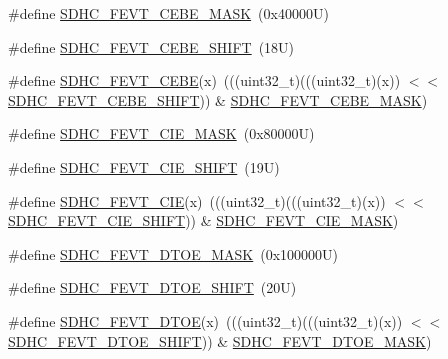 \begin{DoxyCompactItemize}
\item 
\#define \mbox{\hyperlink{group___s_d_h_c___register___masks_ga0d8b77f77f69ea2af8a8a6fe5162c0af}{S\+D\+H\+C\+\_\+\+F\+E\+V\+T\+\_\+\+C\+E\+B\+E\+\_\+\+M\+A\+SK}}~(0x40000\+U)
\item 
\#define \mbox{\hyperlink{group___s_d_h_c___register___masks_gaf981263c00f8808cfcde0ff564529bcc}{S\+D\+H\+C\+\_\+\+F\+E\+V\+T\+\_\+\+C\+E\+B\+E\+\_\+\+S\+H\+I\+FT}}~(18\+U)
\item 
\#define \mbox{\hyperlink{group___s_d_h_c___register___masks_ga8568ab4d0b42622858fb959bba7c5481}{S\+D\+H\+C\+\_\+\+F\+E\+V\+T\+\_\+\+C\+E\+BE}}(x)~(((uint32\+\_\+t)(((uint32\+\_\+t)(x)) $<$$<$ \mbox{\hyperlink{group___s_d_h_c___register___masks_gaf981263c00f8808cfcde0ff564529bcc}{S\+D\+H\+C\+\_\+\+F\+E\+V\+T\+\_\+\+C\+E\+B\+E\+\_\+\+S\+H\+I\+FT}})) \& \mbox{\hyperlink{group___s_d_h_c___register___masks_ga0d8b77f77f69ea2af8a8a6fe5162c0af}{S\+D\+H\+C\+\_\+\+F\+E\+V\+T\+\_\+\+C\+E\+B\+E\+\_\+\+M\+A\+SK}})
\item 
\#define \mbox{\hyperlink{group___s_d_h_c___register___masks_ga3c29789497e34050f12d49b5f8424531}{S\+D\+H\+C\+\_\+\+F\+E\+V\+T\+\_\+\+C\+I\+E\+\_\+\+M\+A\+SK}}~(0x80000\+U)
\item 
\#define \mbox{\hyperlink{group___s_d_h_c___register___masks_ga86ac6629356f3a89fbd8c06167abfac9}{S\+D\+H\+C\+\_\+\+F\+E\+V\+T\+\_\+\+C\+I\+E\+\_\+\+S\+H\+I\+FT}}~(19\+U)
\item 
\#define \mbox{\hyperlink{group___s_d_h_c___register___masks_ga7473cb4fcae69c3c9c74008cfc1d0549}{S\+D\+H\+C\+\_\+\+F\+E\+V\+T\+\_\+\+C\+IE}}(x)~(((uint32\+\_\+t)(((uint32\+\_\+t)(x)) $<$$<$ \mbox{\hyperlink{group___s_d_h_c___register___masks_ga86ac6629356f3a89fbd8c06167abfac9}{S\+D\+H\+C\+\_\+\+F\+E\+V\+T\+\_\+\+C\+I\+E\+\_\+\+S\+H\+I\+FT}})) \& \mbox{\hyperlink{group___s_d_h_c___register___masks_ga3c29789497e34050f12d49b5f8424531}{S\+D\+H\+C\+\_\+\+F\+E\+V\+T\+\_\+\+C\+I\+E\+\_\+\+M\+A\+SK}})
\item 
\#define \mbox{\hyperlink{group___s_d_h_c___register___masks_ga6c5de59c47a6627c08013e5e5af04943}{S\+D\+H\+C\+\_\+\+F\+E\+V\+T\+\_\+\+D\+T\+O\+E\+\_\+\+M\+A\+SK}}~(0x100000\+U)
\item 
\#define \mbox{\hyperlink{group___s_d_h_c___register___masks_gad96cef6ac842de516e11f7e9e519408f}{S\+D\+H\+C\+\_\+\+F\+E\+V\+T\+\_\+\+D\+T\+O\+E\+\_\+\+S\+H\+I\+FT}}~(20\+U)
\item 
\#define \mbox{\hyperlink{group___s_d_h_c___register___masks_ga9e2a0d24f1b2c99f78e5336961416ecc}{S\+D\+H\+C\+\_\+\+F\+E\+V\+T\+\_\+\+D\+T\+OE}}(x)~(((uint32\+\_\+t)(((uint32\+\_\+t)(x)) $<$$<$ \mbox{\hyperlink{group___s_d_h_c___register___masks_gad96cef6ac842de516e11f7e9e519408f}{S\+D\+H\+C\+\_\+\+F\+E\+V\+T\+\_\+\+D\+T\+O\+E\+\_\+\+S\+H\+I\+FT}})) \& \mbox{\hyperlink{group___s_d_h_c___register___masks_ga6c5de59c47a6627c08013e5e5af04943}{S\+D\+H\+C\+\_\+\+F\+E\+V\+T\+\_\+\+D\+T\+O\+E\+\_\+\+M\+A\+SK}})
$$
\end{DoxyCompactItemize}

